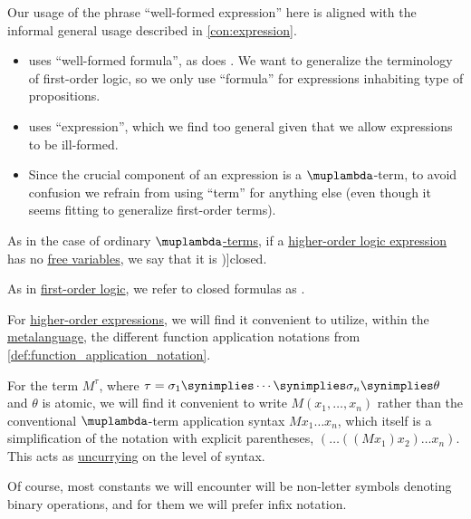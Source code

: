 \begin{comments}
  \item Our usage of the phrase \enquote{well-formed expression} here is aligned with the informal general usage described in \cref{con:expression}.

  \begin{itemize}
    \item \Textcite{Church1940STT} uses \enquote{well-formed formula}, as does \textcite[211]{Andrews2002Logic}. We want to generalize the terminology of first-order logic, so we only use \enquote{formula} for expressions inhabiting type of propositions.

    \item \Textcite[270]{Farmer2008STTVirtues} uses \enquote{expression}, which we find too general given that we allow expressions to be ill-formed.

    \item Since the crucial component of an expression is a \( \muplambda \)-term, to avoid confusion we refrain from using \enquote{term} for anything else (even though it seems fitting to generalize first-order terms).
  \end{itemize}
\end{comments}

\begin{definition}\label{def:hol_closed_expression}
  As in the case of ordinary \hyperref[def:lambda_term]{\( \muplambda \)-terms}, if a \hyperref[def:hol_expression]{higher-order logic expression} has no \hyperref[def:lambda_variable_freeness]{free variables}, we say that it is \term[en=closed expression (\cite[270]{Farmer2008STTVirtues})]{closed}.

  As in \hyperref[def:first_order_logic]{first-order logic}, we refer to closed formulas as .
\end{definition}

\begin{remark}\label{rem:quantifiable_type_uncurrying}
  For \hyperref[def:hol_expression]{higher-order expressions}, we will find it convenient to utilize, within the \hyperref[con:metalanguage]{metalanguage}, the different function application notations from \cref{def:function_application_notation}.

  For the term \( M^\tau \), where \( \tau = \sigma_1 \synimplies \cdots \synimplies \sigma_n \synimplies \theta \) and \( \theta \) is atomic, we will find it convenient to write \( M(x_1, \ldots, x_n) \) rather than the conventional \( \muplambda \)-term application syntax \( M x_1 \ldots x_n \), which itself is a simplification of the notation with explicit parentheses, \( (\ldots ((M x_1) x_2) \ldots x_n) \). This acts as \hyperref[con:currying]{uncurrying} on the level of syntax.

  Of course, most constants we will encounter will be non-letter symbols denoting binary operations, and for them we will prefer infix notation.
\end{remark}

